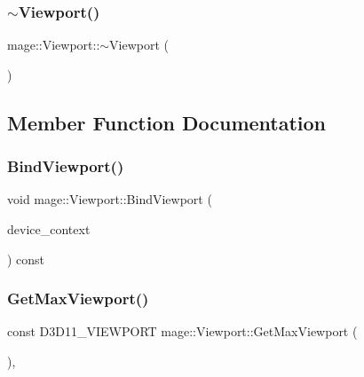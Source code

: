 \hypertarget{structmage_1_1_viewport_a6fcf68e154b186d5c6241c495cc93fe5}{}\label{structmage_1_1_viewport_a6fcf68e154b186d5c6241c495cc93fe5} 
\subsubsection{\texorpdfstring{$\sim$\+Viewport()}{~Viewport()}}
{\footnotesize\ttfamily mage\+::\+Viewport\+::$\sim$\+Viewport (\begin{DoxyParamCaption}{ }\end{DoxyParamCaption})\hspace{0.3cm}{\ttfamily [default]}}



\subsection{Member Function Documentation}
\hypertarget{structmage_1_1_viewport_a90dc0a655ae756c85085b12c6442b8c3}{}\label{structmage_1_1_viewport_a90dc0a655ae756c85085b12c6442b8c3} 
\subsubsection{\texorpdfstring{Bind\+Viewport()}{BindViewport()}}
{\footnotesize\ttfamily void mage\+::\+Viewport\+::\+Bind\+Viewport (\begin{DoxyParamCaption}\item[{I\+D3\+D11\+Device\+Context2 $\ast$}]{device\+\_\+context }\end{DoxyParamCaption}) const\hspace{0.3cm}{\ttfamily [noexcept]}}

\hypertarget{structmage_1_1_viewport_aec4a434cbb6f68805d02f1be6ecbf5a8}{}\label{structmage_1_1_viewport_aec4a434cbb6f68805d02f1be6ecbf5a8} 
\subsubsection{\texorpdfstring{Get\+Max\+Viewport()}{GetMaxViewport()}}
{\footnotesize\ttfamily const D3\+D11\+\_\+\+V\+I\+E\+W\+P\+O\+RT mage\+::\+Viewport\+::\+Get\+Max\+Viewport (\begin{DoxyParamCaption}{ }\end{DoxyParamCaption})\hspace{0.3cm}{\ttfamily [static]}, {\ttfamily [noexcept]}}

